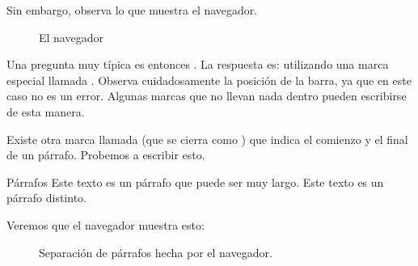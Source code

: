 \documentclass[a4paper,12pt,spanish]{sphinxmanual}
\begin{document}
Sin embargo, observa lo que muestra el navegador.

\begin{figure}[htbp]
\centering
\capstart

\noindent{}
\caption{El navegador }\label{\detokenize{index:id10}}\end{figure}

Una pregunta muy típica es entonces . La respuesta es: utilizando una marca especial llamada . Observa cuidadosamente la posición de la barra, ya que en este caso no es un error. Algunas marcas que no llevan nada dentro pueden escribirse de esta manera.

Existe otra marca llamada  (que se cierra como ) que indica el comienzo y el final de un párrafo. Probemos a escribir esto.

%
\begin{sphinxVerbatim}[commandchars=\\\{\}]
      Párrafos  
      Este texto es un párrafo que puede ser muy largo. 
      Este texto es un párrafo distinto. 
\end{sphinxVerbatim}

Veremos que el navegador muestra esto:

\begin{figure}[htbp]
\centering
\capstart

\noindent{}
\caption{Separación de párrafos hecha por el navegador.}\label{\detokenize{index:id11}}\end{figure}
\end{document}

